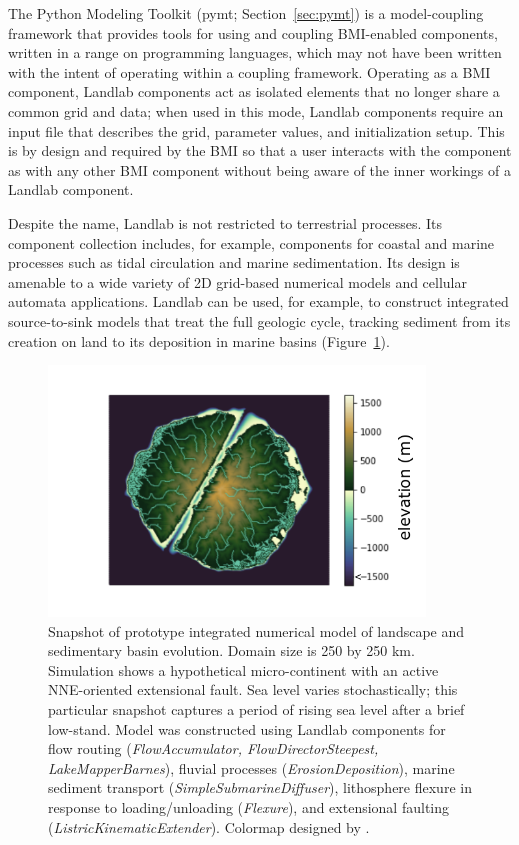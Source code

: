 \documentclass{article} %
\begin{document}
The Python Modeling Toolkit (pymt; Section~\ref{sec:pymt})
is a model-coupling framework that provides tools for using and coupling BMI-enabled components,
written in a range on programming languages, which may not have been written with the intent
of operating within a coupling framework.
Operating as a BMI component, Landlab components act as isolated elements that no longer
share a common grid and data; when used in this mode, Landlab components require an input file that describes the grid, parameter values, and
initialization setup. This is by design and required by the BMI so that a user interacts
with the component as with any other BMI component without being aware of the inner workings
of a Landlab component.


Despite the name, Landlab is not restricted to terrestrial processes. Its component collection includes, for example, components for coastal and marine processes such as tidal circulation and marine sedimentation. Its design is amenable to a wide variety of 2D grid-based numerical models and cellular automata applications. Landlab can be used, for example, to construct integrated source-to-sink models that treat the full geologic cycle, tracking sediment from its creation on land to its deposition in marine basins (Figure~\ref{fig:riftisland}).

\begin{figure}
\includegraphics[width=10cm]{Figures/rift_island202106.pdf}
\caption{Snapshot of prototype integrated numerical model of landscape and sedimentary basin evolution. Domain size is 250 by 250 km. Simulation shows a hypothetical micro-continent with an active NNE-oriented extensional fault. Sea level varies stochastically; this particular snapshot captures a period of rising sea level after a brief low-stand. Model was constructed using Landlab components for flow routing (\textit{FlowAccumulator, FlowDirectorSteepest, LakeMapperBarnes}), fluvial processes (\textit{ErosionDeposition}), marine sediment transport (\textit{SimpleSubmarineDiffuser}), lithosphere flexure in response to loading/unloading (\textit{Flexure}), and extensional faulting (\textit{ListricKinematicExtender}). Colormap designed by \citet{thyng2016true}.}
\label{fig:riftisland}
\end{figure}
\end{document}

